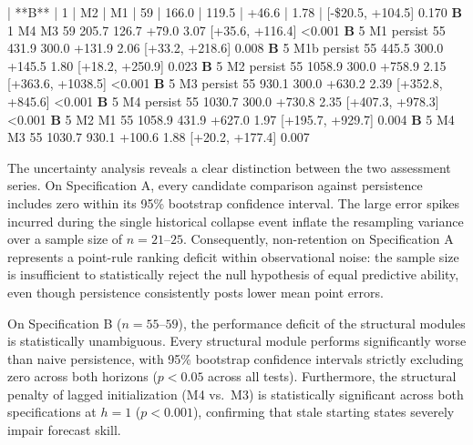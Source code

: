 \documentclass[11pt]{article}
\begin{document}
| **B** | 1 | M2 | M1 | 59 | 166.0 | 119.5 | +46.6 | 1.78 | [\)-\$20.5,
+104.5{]} \textbar{} 0.170 \textbar{} \textbar{} \textbf{B} \textbar{} 1
\textbar{} M4 \textbar{} M3 \textbar{} 59 \textbar{} 205.7 \textbar{}
126.7 \textbar{} +79.0 \textbar{} 3.07 \textbar{} {[}+35.6, +116.4{]}
\textbar{} \textless0.001 \textbar{} \textbar{} \textbf{B} \textbar{} 5
\textbar{} M1 \textbar{} persist \textbar{} 55 \textbar{} 431.9
\textbar{} 300.0 \textbar{} +131.9 \textbar{} 2.06 \textbar{} {[}+33.2,
+218.6{]} \textbar{} 0.008 \textbar{} \textbar{} \textbf{B} \textbar{} 5
\textbar{} M1b \textbar{} persist \textbar{} 55 \textbar{} 445.5
\textbar{} 300.0 \textbar{} +145.5 \textbar{} 1.80 \textbar{} {[}+18.2,
+250.9{]} \textbar{} 0.023 \textbar{} \textbar{} \textbf{B} \textbar{} 5
\textbar{} M2 \textbar{} persist \textbar{} 55 \textbar{} 1058.9
\textbar{} 300.0 \textbar{} +758.9 \textbar{} 2.15 \textbar{} {[}+363.6,
+1038.5{]} \textbar{} \textless0.001 \textbar{} \textbar{} \textbf{B}
\textbar{} 5 \textbar{} M3 \textbar{} persist \textbar{} 55 \textbar{}
930.1 \textbar{} 300.0 \textbar{} +630.2 \textbar{} 2.39 \textbar{}
{[}+352.8, +845.6{]} \textbar{} \textless0.001 \textbar{} \textbar{}
\textbf{B} \textbar{} 5 \textbar{} M4 \textbar{} persist \textbar{} 55
\textbar{} 1030.7 \textbar{} 300.0 \textbar{} +730.8 \textbar{} 2.35
\textbar{} {[}+407.3, +978.3{]} \textbar{} \textless0.001 \textbar{}
\textbar{} \textbf{B} \textbar{} 5 \textbar{} M2 \textbar{} M1
\textbar{} 55 \textbar{} 1058.9 \textbar{} 431.9 \textbar{} +627.0
\textbar{} 1.97 \textbar{} {[}+195.7, +929.7{]} \textbar{} 0.004
\textbar{} \textbar{} \textbf{B} \textbar{} 5 \textbar{} M4 \textbar{}
M3 \textbar{} 55 \textbar{} 1030.7 \textbar{} 930.1 \textbar{} +100.6
\textbar{} 1.88 \textbar{} {[}+20.2, +177.4{]} \textbar{} 0.007
\textbar{}

The uncertainty analysis reveals a clear distinction between the two
assessment series. On Specification A, every candidate comparison
against persistence includes zero within its 95\% bootstrap confidence
interval. The large error spikes incurred during the single historical
collapse event inflate the resampling variance over a sample size of
\(n = 21\text{--}25\). Consequently, non-retention on Specification A
represents a point-rule ranking deficit within observational noise: the
sample size is insufficient to statistically reject the null hypothesis
of equal predictive ability, even though persistence consistently posts
lower mean point errors.

On Specification B (\(n = 55\text{--}59\)), the performance deficit of
the structural modules is statistically unambiguous. Every structural
module performs significantly worse than naive persistence, with 95\%
bootstrap confidence intervals strictly excluding zero across both
horizons (\(p < 0.05\) across all tests). Furthermore, the structural
penalty of lagged initialization (M4 vs.~M3) is statistically
significant across both specifications at \(h=1\) (\(p < 0.001\)),
confirming that stale starting states severely impair forecast skill.
\end{document}
